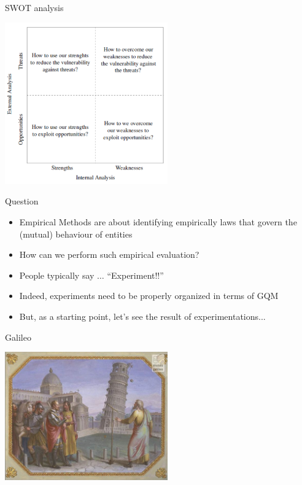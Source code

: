 \documentclass{beamer}
\begin{document}
\begin{frame}{\centerline{SWOT analysis}}

\begin{center}
\includegraphics[width=70mm]{A2022.IDSEPC.SperimentazioneDeduzione/image-07.png}
\end{center}
\end{frame}



\begin{frame}
{\centerline{Question}}

\begin{itemize}
\item Empirical Methods are about identifying empirically laws that govern the (mutual) behaviour of entities
\item How can we perform such empirical evaluation?
\item People typically say $\ldots$ ``Experiment!!''
\item Indeed, experiments need to be properly organized in terms of GQM
\item But, as a starting point, let's see the result of experimentations...
\end{itemize}


\end{frame}

\begin{frame}
{\centerline{Galileo}}

\begin{center}
\includegraphics[width=7cm]{A2022.IDSEPC.SperimentazioneDeduzione/Galileo.png}
\end{center} 

\end{frame}
\end{document}
